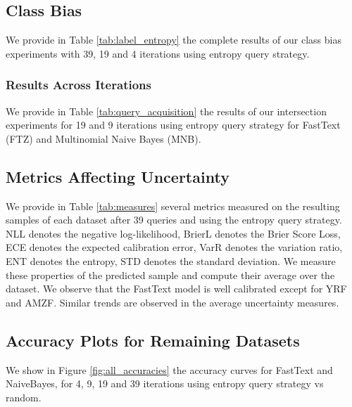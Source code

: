 \documentclass[11pt,a4paper]{article}
\begin{document}
\subsection{Class Bias}
We provide in Table \ref{tab:label_entropy} the complete results of our class bias experiments with 39, 19 and 4 iterations using entropy query strategy. 
\subsubsection{Results Across Iterations}
We provide in Table \ref{tab:query_acquisition} the results of our intersection experiments for 19 and 9 iterations using entropy query strategy for FastText (FTZ) and Multinomial Naive Bayes (MNB). 
\subsection{Metrics Affecting Uncertainty}
We provide in Table \ref{tab:measures} several metrics measured on the resulting samples of each dataset after 39 queries and using the entropy query strategy. NLL denotes the negative log-likelihood, BrierL denotes the Brier Score Loss, ECE denotes the expected calibration error, VarR denotes the variation ratio, ENT denotes the entropy, STD denotes the standard deviation. We measure these properties of the predicted sample and compute their average over the dataset. We observe that the FastText model is well calibrated except for YRF and AMZF. Similar trends are observed in the average uncertainty measures.
\subsection{Accuracy Plots for Remaining Datasets}
We show in Figure \ref{fig:all_accuracies} the accuracy curves for FastText and NaiveBayes, for 4, 9, 19 and 39 iterations using entropy query strategy vs random.
\end{document}
